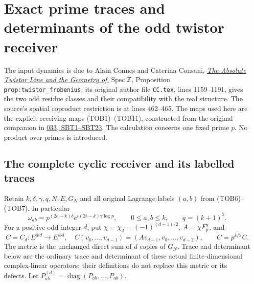\section{Exact prime traces and determinants of the odd twistor receiver}
\label{sec:twistor-prime-trace}

The input dynamics is due to Alain Connes and Caterina Consani,
\href{https://arxiv.org/abs/2609.00299v1}{\emph{The Absolute Twistor Line
and the Geometry of $\overline{\operatorname{Spec}\mathbb Z}$}},
Proposition \texttt{prop:twistor\_frobenius}; its original author file
\nolinkurl{CC.tex}, lines 1159--1191, gives the two odd residue classes
and their compatibility with the real structure. The source's spatial
coproduct restriction is at lines 462--465. The maps used here are the
explicit receiving maps (TOB1)--(TOB11), constructed from the original
companion in
\href{https://github.com/KokunoYumeto/zeta-function-research-reader/blob/3c78cfbd9e194d35117b33277c421c6564ce3dbf/workbenches/splitzero-tandem/continuations/20260923-full-prime-support/033/MIXED_PRIME_ENERGY_AND_BOUNDARY.tex}{033,
SBT1--SBT23}. The calculation concerns one fixed prime $p$. No product
over primes is introduced.

\subsection{The complete cyclic receiver and its labelled traces}

Retain $k,\delta,\gamma,q,N,E,G_N$ and all original Lagrange labels
$(a,b)$ from (TOB6)--(TOB7). In particular
\begin{equation}\tag{TPT1}
 \omega_{ab}=p^{(2a-k)\delta}e^{i(2b-k)\gamma\log p},
 \qquad 0\le a,b\le k,\qquad q=(k+1)^2.
\end{equation}
For a positive odd integer $d$, put $\chi=\chi_d=(-1)^{(d-1)/2}$,
$A=\chi F_p^\chi$, and
\begin{equation}\tag{TPT2}
 C=C_d:E^{\oplus d}\longrightarrow E^{\oplus d},\quad
 C(v_0,\ldots,v_{d-1})=(Av_{d-1},v_0,\ldots,v_{d-2}),
 \qquad \widetilde C=p^{k/2}C.
\end{equation}
The metric is the unchanged direct sum of $d$ copies of $G_N$.
Trace and determinant below are the ordinary trace and determinant
of these actual finite-dimensional complex-linear operators; their
definitions do not replace this metric or its defects.
Let $P_{ab}^{(d)}=\operatorname{diag}(P_{ab},\ldots,P_{ab})$.

